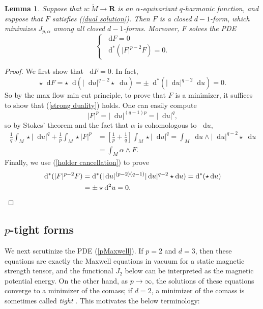 \documentclass[reqno,11pt]{amsart}
\newcommand{\RR}{\mathbf{R}}
\newcommand*\dif{\mathop{}\!\mathrm{d}}
\newcommand{\dfn}[1]{\emph{#1}\index{#1}}
\newtheorem{lemma}[theorem]{Lemma}
\theoremstyle{definition}
\numberwithin{equation}{section}
\begin{document}
\begin{lemma}
Suppose that $u: \tilde M \to \RR$ is an $\alpha$-equivariant $q$-harmonic function, and suppose that $F$ satisfies (\ref{dual solution}).
Then $F$ is a closed $d - 1$-form, which minimizes $J_{p, \alpha}$ among all closed $d - 1$-forms.
Moreover, $F$ solves the PDE 
\begin{equation}\label{pMaxwell}
\begin{cases}
	\dif F = 0 \\
	\dif^* (|F|^{p - 2} F) = 0.
\end{cases}
\end{equation}
\end{lemma}
\begin{proof}
We first show that $\dif F = 0$.
In fact, 
$$\star \dif F = \star \dif(|\dif u|^{q - 2} \star \dif u) = \pm \dif^*(|\dif u|^{q - 2} \dif u) = 0.$$
So by the max flow min cut principle, to prove that $F$ is a minimizer, it suffices to show that (\ref{strong duality}) holds.
One can easily compute 
$$|F|^p = |\dif u|^{(q - 1)p} = |\dif u|^q,$$
so by Stokes' theorem and the fact that $\alpha$ is cohomologous to $\dif u$,
\begin{align*}
\frac{1}{q} \int_M \star |\dif u|^q + \frac{1}{p} \int_M \star |F|^p&
= \left[\frac{1}{p} + \frac{1}{q}\right] \int_M \star |\dif u|^q
= \int_M \dif u \wedge |\dif u|^{q - 2} \star \dif u \\
&= \int_M \alpha \wedge F.
\end{align*}
Finally, we use (\ref{holder cancellation}) to prove
\begin{align*}
\dif^*(|F|^{p - 2} F) &= \dif^*(|\dif u|^{(p - 2)(q - 1)} |\dif u|^{q - 2} \star \dif u) = \dif^*(\star \dif u) \\
&= \pm \star \dif^2 u = 0. \qedhere 
\end{align*}
\end{proof}


\subsection{\texorpdfstring{$p$-tight forms}{p-tight forms}}
We next scrutinize the PDE (\ref{pMaxwell}).
If $p = 2$ and $d = 3$, then these equations are exactly the Maxwell equations in vacuum for a static magnetic strength tensor, and the functional $J_2$ below can be interpreted as the magnetic potential energy.
On the other hand, as $p \to \infty$, the solutions of these equations converge to a minimizer of the comass; if $d = 2$, a minimizer of the comass is sometimes called \dfn{tight} \cite{farre23}.
This motivates the below terminology:
\end{document}
